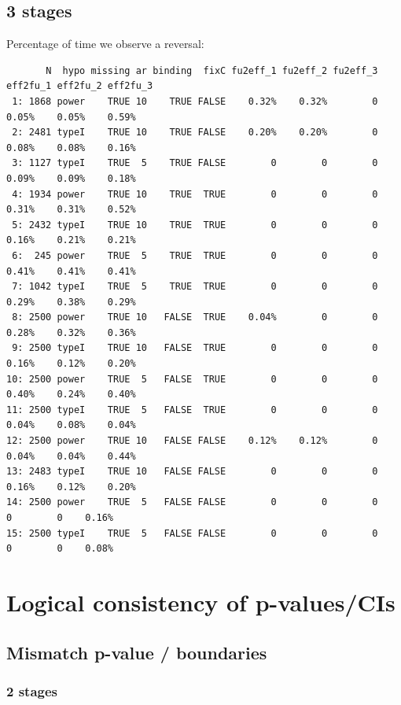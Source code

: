 \documentclass[12pt]{article}
\begin{document}
\subsection{3 stages}
\label{sec:org0cd38dc}
Percentage of time we observe a reversal:
\begin{verbatim}
       N  hypo missing ar binding  fixC fu2eff_1 fu2eff_2 fu2eff_3 eff2fu_1 eff2fu_2 eff2fu_3
 1: 1868 power    TRUE 10    TRUE FALSE    0.32%    0.32%        0    0.05%    0.05%    0.59%
 2: 2481 typeI    TRUE 10    TRUE FALSE    0.20%    0.20%        0    0.08%    0.08%    0.16%
 3: 1127 typeI    TRUE  5    TRUE FALSE        0        0        0    0.09%    0.09%    0.18%
 4: 1934 power    TRUE 10    TRUE  TRUE        0        0        0    0.31%    0.31%    0.52%
 5: 2432 typeI    TRUE 10    TRUE  TRUE        0        0        0    0.16%    0.21%    0.21%
 6:  245 power    TRUE  5    TRUE  TRUE        0        0        0    0.41%    0.41%    0.41%
 7: 1042 typeI    TRUE  5    TRUE  TRUE        0        0        0    0.29%    0.38%    0.29%
 8: 2500 power    TRUE 10   FALSE  TRUE    0.04%        0        0    0.28%    0.32%    0.36%
 9: 2500 typeI    TRUE 10   FALSE  TRUE        0        0        0    0.16%    0.12%    0.20%
10: 2500 power    TRUE  5   FALSE  TRUE        0        0        0    0.40%    0.24%    0.40%
11: 2500 typeI    TRUE  5   FALSE  TRUE        0        0        0    0.04%    0.08%    0.04%
12: 2500 power    TRUE 10   FALSE FALSE    0.12%    0.12%        0    0.04%    0.04%    0.44%
13: 2483 typeI    TRUE 10   FALSE FALSE        0        0        0    0.16%    0.12%    0.20%
14: 2500 power    TRUE  5   FALSE FALSE        0        0        0        0        0    0.16%
15: 2500 typeI    TRUE  5   FALSE FALSE        0        0        0        0        0    0.08%
\end{verbatim}


\clearpage

\section{Logical consistency of p-values/CIs}
\label{sec:orgab7644f}


\subsection{Mismatch p-value / boundaries}
\label{sec:orgf13b1c3}
\subsubsection{2 stages}
\label{sec:org9ea0e19}
\end{document}
